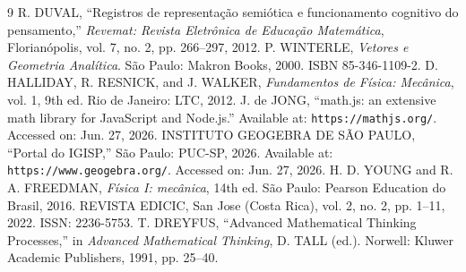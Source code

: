 \documentclass[conference,a4paper]{IEEEtran}
\begin{document}
\begin{thebibliography}{9}
 R. DUVAL, ``Registros de representação semiótica e funcionamento cognitivo do pensamento,'' \textit{Revemat: Revista Eletrônica de Educação Matemática}, Florianópolis, vol. 7, no. 2, pp. 266--297, 2012.
 P. WINTERLE, \textit{Vetores e Geometria Analítica}. São Paulo: Makron Books, 2000. ISBN 85-346-1109-2.
 D. HALLIDAY, R. RESNICK, and J. WALKER, \textit{Fundamentos de Física: Mecânica}, vol. 1, 9th ed. Rio de Janeiro: LTC, 2012.
 J. de JONG, ``math.js: an extensive math library for JavaScript and Node.js.'' Available at: \texttt{https://mathjs.org/}. Accessed on: Jun. 27, 2026.
 INSTITUTO GEOGEBRA DE SÃO PAULO, ``Portal do IGISP,'' São Paulo: PUC-SP, 2026. Available at: \texttt{https://www.geogebra.org/}. Accessed on: Jun. 27, 2026.
 H. D. YOUNG and R. A. FREEDMAN, \textit{Física I: mecânica}, 14th ed. São Paulo: Pearson Education do Brasil, 2016.
 REVISTA EDICIC, San Jose (Costa Rica), vol. 2, no. 2, pp. 1--11, 2022. ISSN: 2236-5753.
 T. DREYFUS, ``Advanced Mathematical Thinking Processes,'' in \textit{Advanced Mathematical Thinking}, D. TALL (ed.). Norwell: Kluwer Academic Publishers, 1991, pp. 25--40.
\end{thebibliography}
\end{document}
